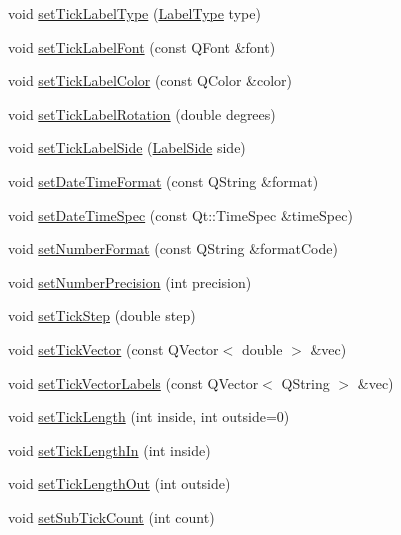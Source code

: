 \begin{DoxyCompactItemize}
\item 
void \hyperlink{classQCPAxis_a54f24f5ce8feea25209388a863d7e448}{set\+Tick\+Label\+Type} (\hyperlink{classQCPAxis_a4a7da0166f755f5abac23b765d184cad}{Label\+Type} type)
\item 
void \hyperlink{classQCPAxis_a2b8690c4e8dbc39d9185d2b398ce7a6c}{set\+Tick\+Label\+Font} (const Q\+Font \&font)
\item 
void \hyperlink{classQCPAxis_a395e445c3fe496b935bee7b911ecfd1c}{set\+Tick\+Label\+Color} (const Q\+Color \&color)
\item 
void \hyperlink{classQCPAxis_a1bddd4413df8a576b7ad4b067fb33375}{set\+Tick\+Label\+Rotation} (double degrees)
\item 
void \hyperlink{classQCPAxis_a13ec644fc6e22715744c92c6dfa4f0fa}{set\+Tick\+Label\+Side} (\hyperlink{classQCPAxis_a24b13374b9b8f75f47eed2ea78c37db9}{Label\+Side} side)
\item 
void \hyperlink{classQCPAxis_a2ee0191daa03524a682113e63e05f7a7}{set\+Date\+Time\+Format} (const Q\+String \&format)
\item 
void \hyperlink{classQCPAxis_a262e06731debed7eee11fa6a81d67eaf}{set\+Date\+Time\+Spec} (const Qt\+::\+Time\+Spec \&time\+Spec)
\item 
void \hyperlink{classQCPAxis_ae585a54dc2aac662e90a2ca82f002590}{set\+Number\+Format} (const Q\+String \&format\+Code)
\item 
void \hyperlink{classQCPAxis_a21dc8023ad7500382ad9574b48137e63}{set\+Number\+Precision} (int precision)
\item 
void \hyperlink{classQCPAxis_af727db0acc6492c4c774c0700e738205}{set\+Tick\+Step} (double step)
\item 
void \hyperlink{classQCPAxis_a871db94c5d796c80fcbe1a9d4506e27e}{set\+Tick\+Vector} (const Q\+Vector$<$ double $>$ \&vec)
\item 
void \hyperlink{classQCPAxis_a921d3ba3853ca3bd2cce3459f7a243ed}{set\+Tick\+Vector\+Labels} (const Q\+Vector$<$ Q\+String $>$ \&vec)
\item 
void \hyperlink{classQCPAxis_a62ec40bebe3540e9c1479a8fd2be3b0d}{set\+Tick\+Length} (int inside, int outside=0)
\item 
void \hyperlink{classQCPAxis_afae1a37a99611366275a51204d991739}{set\+Tick\+Length\+In} (int inside)
\item 
void \hyperlink{classQCPAxis_a3b8a0debd1ffedd2c22d0592dfbb4e62}{set\+Tick\+Length\+Out} (int outside)
\item 
void \hyperlink{classQCPAxis_a4b1554ead9d7f9799650d51383e326dd}{set\+Sub\+Tick\+Count} (int count)

\end{DoxyCompactItemize}
